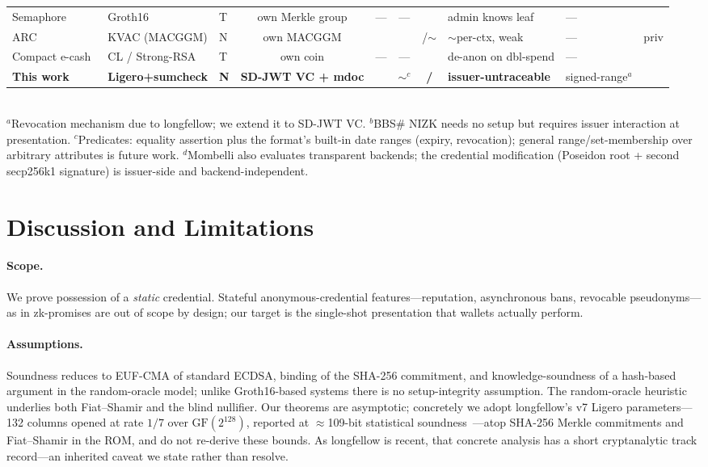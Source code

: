 \documentclass[11pt]{article}
\newcommand{\cmark}{\ding{51}}          %
\newcommand{\xmark}{\ding{55}}          %
\newcommand{\pmark}{$\sim$}             %
\theoremstyle{plain}
\theoremstyle{definition}
\begin{document}
\begin{table}[t]
{\begin{tabular}{@{}lllccccll c@{}}
Semaphore~\cite{semaphore} & Groth16 & T & own Merkle group & --- & --- & \cmark & \xmark admin knows leaf & --- & \cmark\\
ARC~\cite{arc-draft} & KVAC (MACGGM) & N & own MACGGM & \xmark & \xmark & \cmark/\pmark & \pmark per-ctx, weak & --- & \xmark priv\\
Compact e-cash~\cite{chl2005} & CL / Strong-RSA & T & own coin & --- & --- & \cmark & \xmark de-anon on dbl-spend & --- & \cmark\\
\textbf{This work} & \textbf{Ligero+sumcheck} & \textbf{N} & \textbf{SD-JWT VC + mdoc} & \cmark & \pmark$^{c}$ & \textbf{\cmark/\cmark} & \textbf{\cmark issuer-untraceable} & signed-range$^{a}$ & \cmark\\
\bottomrule
\end{tabular}}
\\[2pt]
{\footnotesize $^{a}$Revocation mechanism due to longfellow; we extend it to SD-JWT VC.
\quad $^{b}$BBS\# NIZK needs no setup but requires issuer interaction at presentation.
\quad $^{c}$Predicates: equality assertion plus the format's built-in date ranges
(expiry, revocation); general range/set-membership over arbitrary attributes is future work.
\quad $^{d}$Mombelli also evaluates transparent backends; the credential modification
(Poseidon root + second secp256k1 signature) is issuer-side and backend-independent.}
\end{table}

\section{Discussion and Limitations}\label{sec:discussion}
\paragraph{Scope.} We prove possession of a \emph{static} credential. Stateful
anonymous-credential features---reputation, asynchronous bans, revocable
pseudonyms---as in zk-promises are out of scope by design; our target is the
single-shot presentation that wallets actually perform.
\paragraph{Assumptions.} Soundness reduces to EUF-CMA of standard ECDSA, binding of the
SHA-256 commitment, and knowledge-soundness of a hash-based argument in the
random-oracle model; unlike Groth16-based systems there is no setup-integrity
assumption. The random-oracle heuristic underlies both Fiat--Shamir and the blind
nullifier. Our theorems are asymptotic; concretely we adopt longfellow's v7 Ligero
parameters---132 columns opened at rate $1/7$ over $\mathrm{GF}(2^{128})$, reported at
$\approx$109-bit statistical soundness~\cite{frigo2024longfellow,libzk-draft}---atop
SHA-256 Merkle commitments and Fiat--Shamir in the ROM, and do not re-derive these
bounds. As longfellow is recent, that concrete analysis has a
short cryptanalytic track record---an inherited caveat we state rather than resolve.
\end{document}
